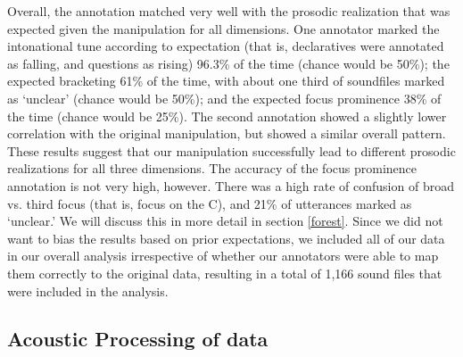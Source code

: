 \documentclass[preprint,review,12pt,authoryear,times]{elsarticle}
\begin{document}
Overall, the annotation matched very well with the prosodic realization that was expected given the manipulation for all dimensions. One annotator marked the intonational tune according to expectation (that is, declaratives were annotated as falling, and questions as rising) 96.3\% of the time (chance would be 50\%); the expected bracketing  61\% of the time, with about one third of soundfiles marked as `unclear' (chance would be 50\%); and the expected focus prominence  38\% of the time (chance would be 25\%). The second annotation showed a slightly lower correlation with the original manipulation, but showed a similar overall pattern. These results suggest that our manipulation successfully lead to different prosodic realizations for all three dimensions. The accuracy of the focus prominence annotation is not very high, however. There was a high rate of confusion of broad vs. third focus (that is, focus on the C), and 21\% of utterances marked as `unclear.' We will discuss this in more detail in section \ref{forest}. Since we did not want to bias the results based on prior expectations, we included all of our data in our overall analysis irrespective of whether our annotators were able to map them correctly to the original data, resulting in a total of 1,166 sound files that were included in the analysis. 


\subsection{Acoustic Processing of data}
\end{document}
